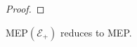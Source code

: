 \begin{proof}

\end{proof}

\begin{proposition}
  MEP$(\mathcal{E}_{+})$ reduces to MEP\@.
\label{lem:plus}
\end{proposition}

